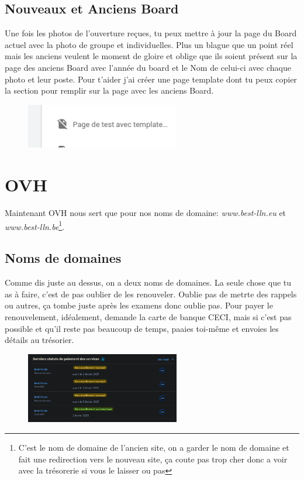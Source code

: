 \documentclass[12pt]{article}
\begin{document}
	\subsection{Nouveaux et Anciens Board}
	Une fois les photos de l'ouverture reçues, tu peux mettre à jour la page du Board actuel avec la photo de groupe et individuelles.
	Plus un blague que un point réel mais les anciens veulent le moment de gloire et oblige que ils soient présent sur la page des anciens Board avec l'année du board et le Nom de celui-ci avec chaque photo et leur poste.
	Pour t'aider j'ai créer une page template dont tu peux copier la section pour remplir sur la page avec les anciens Board.
	\begin{figure}[htp]
		\centering
		\includegraphics[width=0.6\textwidth]{img/TemplateBoard.png}
	\end{figure} 
	
\newpage
\section{OVH}
	Maintenant OVH nous sert que pour nos noms de domaine: \textit{www.best-lln.eu} et \textit{www.best-lln.be}\footnote{C'est le nom de domaine de l'ancien site, on a garder le nom de domaine et fait une redirection vers le nouveau site, ça coute pas trop cher donc a voir avec la trésorerie si vous le laisser ou pas}. 
	
	\subsection{Noms de domaines}
	Comme dis juste au dessus, on a deux noms de domaines. La seule chose que tu as à faire, c'est de pas oublier de les renouveler. Oublie pas de metrte des rappels ou autres, ça tombe juste après les examens donc oublie pas. Pour payer le renouvelement, idéalement, demande la carte de banque CECI, mais si c'est pas possible et qu'il reste pas beaucoup de temps, paaies toi-même et envoies les détails au trésorier.
	\begin{figure}[htp]
		\centering
		\includegraphics[width=0.6\textwidth]{img/NomsDomaine.png}
	\end{figure}
\end{document}

